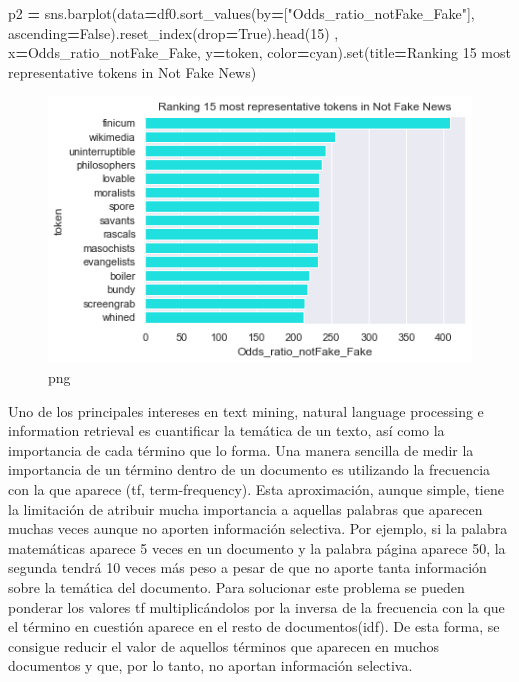 \documentclass[
  11pt,
  a4paper,
]{article}
\newenvironment{Shaded}{\begin{snugshade}}{\end{snugshade}}
\newcommand{\BuiltInTok}[1]{#1}
\newcommand{\DecValTok}[1]{\textcolor[rgb]{0.00,0.00,0.81}{#1}}
\newcommand{\NormalTok}[1]{#1}
\newcommand{\OperatorTok}[1]{\textcolor[rgb]{0.81,0.36,0.00}{\textbf{#1}}}
\newcommand{\StringTok}[1]{\textcolor[rgb]{0.31,0.60,0.02}{#1}}
\newcommand{\VariableTok}[1]{\textcolor[rgb]{0.00,0.00,0.00}{#1}}
\begin{document}
\begin{Shaded}
\begin{Highlighting}[]
\NormalTok{p2 }\OperatorTok{=}\NormalTok{ sns.barplot(data}\OperatorTok{=}\NormalTok{df0.sort\_values(by}\OperatorTok{=}\NormalTok{[}\StringTok{"Odds\_ratio\_notFake\_Fake"}\NormalTok{], ascending}\OperatorTok{=}\VariableTok{False}\NormalTok{).reset\_index(drop}\OperatorTok{=}\VariableTok{True}\NormalTok{).head(}\DecValTok{15}\NormalTok{) ,}
\NormalTok{                 x}\OperatorTok{=}\StringTok{\textquotesingle{}Odds\_ratio\_notFake\_Fake\textquotesingle{}}\NormalTok{, y}\OperatorTok{=}\StringTok{\textquotesingle{}token\textquotesingle{}}\NormalTok{, color}\OperatorTok{=}\StringTok{\textquotesingle{}cyan\textquotesingle{}}\NormalTok{).}\BuiltInTok{set}\NormalTok{(title}\OperatorTok{=}\StringTok{\textquotesingle{}Ranking 15 most representative tokens in Not Fake News\textquotesingle{}}\NormalTok{) }
\end{Highlighting}
\end{Shaded}

\begin{figure}
\centering
\includegraphics{output_96_0.png}
\caption{png}
\end{figure}

Uno de los principales intereses en text mining, natural language
processing e information retrieval es cuantificar la temática de un
texto, así como la importancia de cada término que lo forma. Una manera
sencilla de medir la importancia de un término dentro de un documento es
utilizando la frecuencia con la que aparece (tf, term-frequency). Esta
aproximación, aunque simple, tiene la limitación de atribuir mucha
importancia a aquellas palabras que aparecen muchas veces aunque no
aporten información selectiva. Por ejemplo, si la palabra matemáticas
aparece 5 veces en un documento y la palabra página aparece 50, la
segunda tendrá 10 veces más peso a pesar de que no aporte tanta
información sobre la temática del documento. Para solucionar este
problema se pueden ponderar los valores tf multiplicándolos por la
inversa de la frecuencia con la que el término en cuestión aparece en el
resto de documentos(idf). De esta forma, se consigue reducir el valor de
aquellos términos que aparecen en muchos documentos y que, por lo tanto,
no aportan información selectiva.
\end{document}
